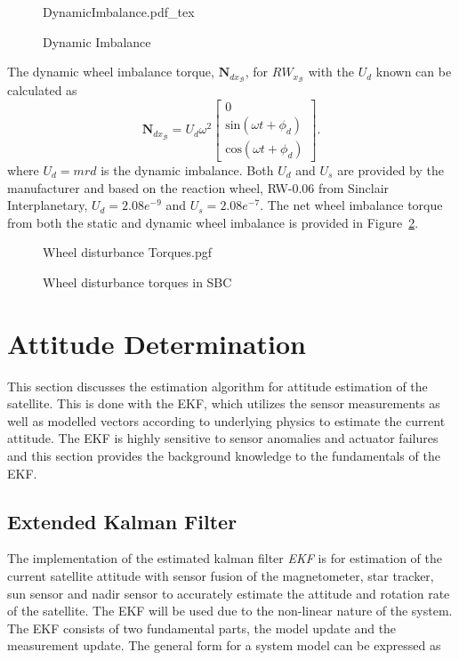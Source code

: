 \begin{figure}[!htb]
	\centering
	\def\svgwidth{10cm}
	{DynamicImbalance.pdf_tex}
	\caption{Dynamic Imbalance}
	\label{fig:DynamicImbalance}
\end{figure}
The dynamic wheel imbalance torque, $\mathbf{N}_{dx_\mathcal{B}}$, for $RW_{x_\mathcal{B}}$ with the $U_d$ known can be calculated as 
\begin{equation}
\mathbf{N}_{dx_\mathcal{B}} = U_d\omega^2 \begin{bmatrix} 0 \\ \text{sin}(\omega t + \phi_d) \\ \text{cos}(\omega t + \phi_d)\end{bmatrix}.
\end{equation}
where $U_d = mrd$ is the dynamic imbalance. Both $U_d$ and $U_s$ are provided by the manufacturer and based on the reaction wheel, RW-0.06 from Sinclair Interplanetary, $U_d = 2.08e^{-9}$ and $U_s = 2.08e^{-7}$. The net wheel imbalance torque from both the static and dynamic wheel imbalance is provided in Figure~\ref{fig:Wheel disturbance Torques}.

\begin{figure}[!htb]
	\centering
	\def\pgfwidth{10cm}
	{Wheel disturbance Torques.pgf}
	
	\caption{Wheel disturbance torques in SBC}
	\label{fig:Wheel disturbance Torques}
\end{figure}

\section{Attitude Determination}
This section discusses the estimation algorithm for attitude estimation of the satellite. This is done with the EKF, which utilizes the sensor measurements as well as modelled vectors according to underlying physics to estimate the current attitude. The EKF is highly sensitive to sensor anomalies and actuator failures and this section provides the background knowledge to the fundamentals of the EKF.

\subsection{Extended Kalman Filter}
The implementation of the estimated kalman filter \emph{EKF} is for estimation of the current satellite attitude with sensor fusion of the magnetometer, star tracker, sun sensor and nadir sensor to accurately estimate the attitude and rotation rate of the satellite. The EKF will be used due to the non-linear nature of the system. The EKF consists of two fundamental parts, the model update and the measurement update. The general form for a system model can be expressed as

